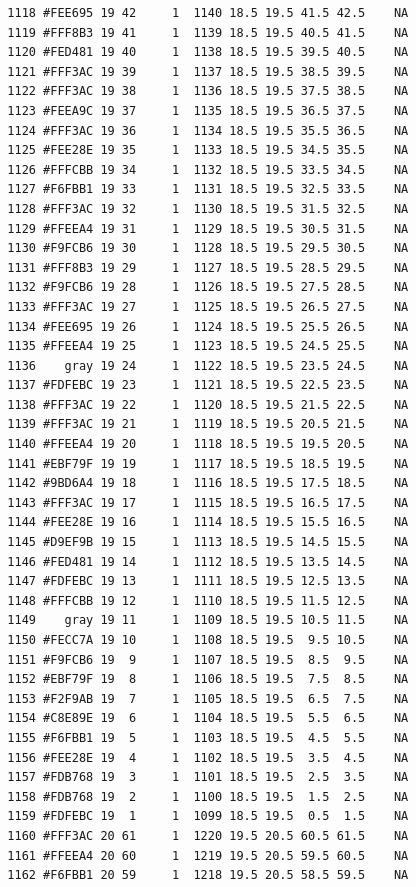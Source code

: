\documentclass[12pt,twoside]{reedthesis}
\begin{document}
\begin{verbatim}
  1118 #FEE695 19 42     1  1140 18.5 19.5 41.5 42.5    NA
  1119 #FFF8B3 19 41     1  1139 18.5 19.5 40.5 41.5    NA
  1120 #FED481 19 40     1  1138 18.5 19.5 39.5 40.5    NA
  1121 #FFF3AC 19 39     1  1137 18.5 19.5 38.5 39.5    NA
  1122 #FFF3AC 19 38     1  1136 18.5 19.5 37.5 38.5    NA
  1123 #FEEA9C 19 37     1  1135 18.5 19.5 36.5 37.5    NA
  1124 #FFF3AC 19 36     1  1134 18.5 19.5 35.5 36.5    NA
  1125 #FEE28E 19 35     1  1133 18.5 19.5 34.5 35.5    NA
  1126 #FFFCBB 19 34     1  1132 18.5 19.5 33.5 34.5    NA
  1127 #F6FBB1 19 33     1  1131 18.5 19.5 32.5 33.5    NA
  1128 #FFF3AC 19 32     1  1130 18.5 19.5 31.5 32.5    NA
  1129 #FFEEA4 19 31     1  1129 18.5 19.5 30.5 31.5    NA
  1130 #F9FCB6 19 30     1  1128 18.5 19.5 29.5 30.5    NA
  1131 #FFF8B3 19 29     1  1127 18.5 19.5 28.5 29.5    NA
  1132 #F9FCB6 19 28     1  1126 18.5 19.5 27.5 28.5    NA
  1133 #FFF3AC 19 27     1  1125 18.5 19.5 26.5 27.5    NA
  1134 #FEE695 19 26     1  1124 18.5 19.5 25.5 26.5    NA
  1135 #FFEEA4 19 25     1  1123 18.5 19.5 24.5 25.5    NA
  1136    gray 19 24     1  1122 18.5 19.5 23.5 24.5    NA
  1137 #FDFEBC 19 23     1  1121 18.5 19.5 22.5 23.5    NA
  1138 #FFF3AC 19 22     1  1120 18.5 19.5 21.5 22.5    NA
  1139 #FFF3AC 19 21     1  1119 18.5 19.5 20.5 21.5    NA
  1140 #FFEEA4 19 20     1  1118 18.5 19.5 19.5 20.5    NA
  1141 #EBF79F 19 19     1  1117 18.5 19.5 18.5 19.5    NA
  1142 #9BD6A4 19 18     1  1116 18.5 19.5 17.5 18.5    NA
  1143 #FFF3AC 19 17     1  1115 18.5 19.5 16.5 17.5    NA
  1144 #FEE28E 19 16     1  1114 18.5 19.5 15.5 16.5    NA
  1145 #D9EF9B 19 15     1  1113 18.5 19.5 14.5 15.5    NA
  1146 #FED481 19 14     1  1112 18.5 19.5 13.5 14.5    NA
  1147 #FDFEBC 19 13     1  1111 18.5 19.5 12.5 13.5    NA
  1148 #FFFCBB 19 12     1  1110 18.5 19.5 11.5 12.5    NA
  1149    gray 19 11     1  1109 18.5 19.5 10.5 11.5    NA
  1150 #FECC7A 19 10     1  1108 18.5 19.5  9.5 10.5    NA
  1151 #F9FCB6 19  9     1  1107 18.5 19.5  8.5  9.5    NA
  1152 #EBF79F 19  8     1  1106 18.5 19.5  7.5  8.5    NA
  1153 #F2F9AB 19  7     1  1105 18.5 19.5  6.5  7.5    NA
  1154 #C8E89E 19  6     1  1104 18.5 19.5  5.5  6.5    NA
  1155 #F6FBB1 19  5     1  1103 18.5 19.5  4.5  5.5    NA
  1156 #FEE28E 19  4     1  1102 18.5 19.5  3.5  4.5    NA
  1157 #FDB768 19  3     1  1101 18.5 19.5  2.5  3.5    NA
  1158 #FDB768 19  2     1  1100 18.5 19.5  1.5  2.5    NA
  1159 #FDFEBC 19  1     1  1099 18.5 19.5  0.5  1.5    NA
  1160 #FFF3AC 20 61     1  1220 19.5 20.5 60.5 61.5    NA
  1161 #FFEEA4 20 60     1  1219 19.5 20.5 59.5 60.5    NA
  1162 #F6FBB1 20 59     1  1218 19.5 20.5 58.5 59.5    NA

\end{verbatim}
\end{document}
